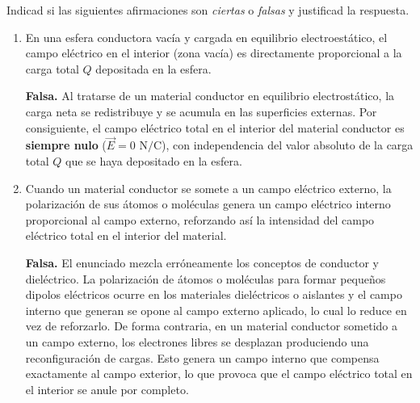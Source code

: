 \documentclass[11pt, a4paper]{article}
\newenvironment{problem}[1][Cuestión]{
	\vspace{0.5cm}
	\noindent{\Large\bfseries #1} \par\vspace{0.5cm}
}{
	\vspace{0.5cm}
}
\begin{document}
	\begin{problem}[Cuestión 5]
		Indicad si las siguientes afirmaciones son \textit{ciertas} o \textit{falsas} y justificad la respuesta.

		\begin{enumerate}[label=\alph*)] 
			\item En una esfera conductora vacía y cargada en equilibrio electroestático, el campo eléctrico en el interior (zona vacía) es directamente proporcional a la carga total $Q$ depositada en la esfera.

				{ \color{blue}
					\textbf{Falsa.} Al tratarse de un material conductor en equilibrio electrostático, la carga neta se redistribuye y se acumula en las superficies externas. Por consiguiente, el campo eléctrico total en el interior del material conductor es \textbf{siempre nulo} ($\vec{E} = 0 \text{ N/C}$), con independencia del valor absoluto de la carga total $Q$ que se haya depositado en la esfera.
				}

			\item Cuando un material conductor se somete a un campo eléctrico externo, la polarización de sus átomos o moléculas genera un campo eléctrico interno proporcional al campo externo, reforzando así la intensidad del campo eléctrico total en el interior del material.

				{ \color{blue}
					\textbf{Falsa.} El enunciado mezcla erróneamente los conceptos de conductor y dieléctrico. La polarización de átomos o moléculas para formar pequeños dipolos eléctricos ocurre en los materiales dieléctricos o aislantes y el campo interno que generan se opone al campo externo aplicado, lo cual lo reduce en vez de reforzarlo. De forma contraria, en un material conductor sometido a un campo externo, los electrones libres se desplazan produciendo una reconfiguración de cargas. Esto genera un campo interno que compensa exactamente al campo exterior, lo que provoca que el campo eléctrico total en el interior se anule por completo.
				}
		\end{enumerate}
	\end{problem}
\end{document}
